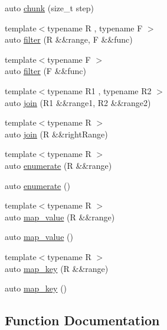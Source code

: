 \begin{DoxyCompactItemize}
\item 
auto \mbox{\hyperlink{namespacerah_1_1view_ab29a0945581f92240cbcc9f81811c08b}{chunk}} (size\+\_\+t step)
\item 
{\footnotesize template$<$typename R , typename F $>$ }\\auto \mbox{\hyperlink{namespacerah_1_1view_a1eade9e2861e5bdae07b01ac9bf2c10c}{filter}} (R \&\&range, F \&\&func)
\item 
{\footnotesize template$<$typename F $>$ }\\auto \mbox{\hyperlink{namespacerah_1_1view_a315ba2143c833b24d05481c68b6cf2da}{filter}} (F \&\&func)
\item 
{\footnotesize template$<$typename R1 , typename R2 $>$ }\\auto \mbox{\hyperlink{namespacerah_1_1view_aa09a3ac754f081d0e8194da7dad09837}{join}} (R1 \&\&range1, R2 \&\&range2)
\item 
{\footnotesize template$<$typename R $>$ }\\auto \mbox{\hyperlink{namespacerah_1_1view_a36ca079794ef3ae1702d92bf4cfd6030}{join}} (R \&\&right\+Range)
\item 
{\footnotesize template$<$typename R $>$ }\\auto \mbox{\hyperlink{namespacerah_1_1view_a420160b047554df1bf986946050238ed}{enumerate}} (R \&\&range)
\item 
auto \mbox{\hyperlink{namespacerah_1_1view_ac815f5494e5a7a182cafb70224b93a6a}{enumerate}} ()
\item 
{\footnotesize template$<$typename R $>$ }\\auto \mbox{\hyperlink{namespacerah_1_1view_a7896dcebf13a4294254ed87743ba3ad0}{map\+\_\+value}} (R \&\&range)
\item 
auto \mbox{\hyperlink{namespacerah_1_1view_ad11fcca5438e227541594a917a85f77c}{map\+\_\+value}} ()
\item 
{\footnotesize template$<$typename R $>$ }\\auto \mbox{\hyperlink{namespacerah_1_1view_a273917511589d75b32d28b56b7de2655}{map\+\_\+key}} (R \&\&range)
\item 
auto \mbox{\hyperlink{namespacerah_1_1view_aac8d9437b8c96e0e8e972c4c10d584e5}{map\+\_\+key}} ()
\end{DoxyCompactItemize}


\subsection{Function Documentation}
\mbox{\label{namespacerah_1_1view_a08f246d1e3e728738c48741274f5e9d7}} 

